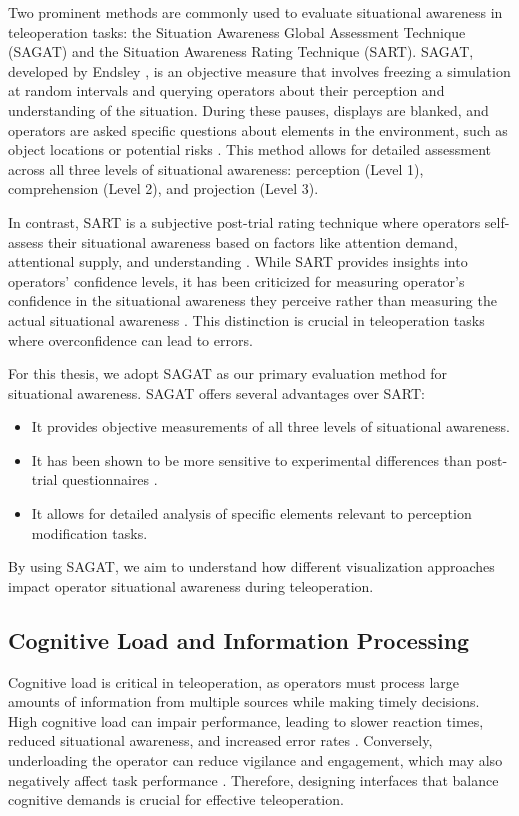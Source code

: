 Two prominent methods are commonly used to evaluate situational awareness in teleoperation tasks: the Situation Awareness Global Assessment Technique (SAGAT) and the Situation Awareness Rating Technique (SART). SAGAT, developed by Endsley \cite{endsley1988sagat}, is an objective measure that involves freezing a simulation at random intervals and querying operators about their perception and understanding of the situation. During these pauses, displays are blanked, and operators are asked specific questions about elements in the environment, such as object locations or potential risks \cite{endsley2000direct}. This method allows for detailed assessment across all three levels of situational awareness: perception (Level 1), comprehension (Level 2), and projection (Level 3).

In contrast, SART is a subjective post-trial rating technique where operators self-assess their situational awareness based on factors like attention demand, attentional supply, and understanding \cite{taylor1990sart}. While SART provides insights into operators' confidence levels, it has been criticized for measuring operator's confidence in the situational awareness they perceive rather than measuring the actual situational awareness \cite{endsley2020review}. This distinction is crucial in teleoperation tasks where overconfidence can lead to errors.

For this thesis, we adopt SAGAT as our primary evaluation method for situational awareness. SAGAT offers several advantages over SART:
\begin{itemize}
    \item It provides objective measurements of all three levels of situational awareness.
    \item It has been shown to be more sensitive to experimental differences than post-trial questionnaires \cite{endsley2000direct}.
    \item It allows for detailed analysis of specific elements relevant to perception modification tasks.
\end{itemize}
By using SAGAT, we aim to understand how different visualization approaches impact operator situational awareness during teleoperation.

\subsection{Cognitive Load and Information Processing}
Cognitive load is critical in teleoperation, as operators must process large amounts of information from multiple sources while making timely decisions. High cognitive load can impair performance, leading to slower reaction times, reduced situational awareness, and increased error rates \cite{Kettwich}. Conversely, underloading the operator can reduce vigilance and engagement, which may also negatively affect task performance \cite{mutzenich2021updating}. Therefore, designing interfaces that balance cognitive demands is crucial for effective teleoperation.

